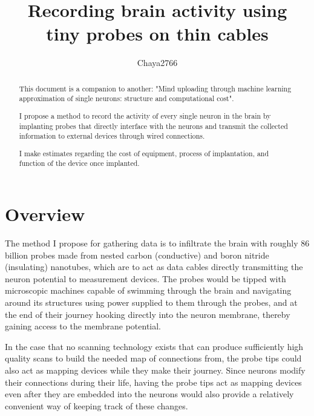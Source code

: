 \documentclass[a4paper]{article}
\title{Recording brain activity using\\tiny probes on thin cables}
\author{Chaya2766}
\begin{document}
	\sffamily
	\hyphenchar{}
	\sloppy
	
	\maketitle
	
	\textbf{
		\sloppy
		\hyphenchar{}
		}
	
	\vfill
	
	\begin{abstract}
        \hyphenchar{}
        \sloppy
        
        This document is a companion to another: "Mind uploading through machine learning approximation of single neurons: structure and computational cost".
        
        \medskip
        
        I propose a method to record the activity of every single neuron in the brain by implanting probes that directly interface with the neurons and transmit the collected information to external devices through wired connections.
        
        \medskip
        
        I make estimates regarding the cost of equipment, process of implantation, and function of the device once implanted.
	\end{abstract}
	
	\vfill
	
	\tableofcontents
	
	\pagebreak
	
	\section{Overview}
	
	The method I propose for gathering data is to infiltrate the brain with roughly 86 billion probes made from nested carbon (conductive) and boron nitride (insulating) nanotubes, which are to act as data cables directly transmitting the neuron potential to measurement devices. The probes would be tipped with microscopic machines capable of swimming through the brain and navigating around its structures using power supplied to them through the probes, and at the end of their journey hooking directly into the neuron membrane, thereby gaining access to the membrane potential.
    
    \medskip
    
    In the case that no scanning technology exists that can produce sufficiently high quality scans to build the needed map of connections from, the probe tips could also act as mapping devices while they make their journey. Since neurons modify their connections during their life, having the probe tips act as mapping devices even after they are embedded into the neurons would also provide a relatively convenient way of keeping track of these changes.
    
\end{document}
